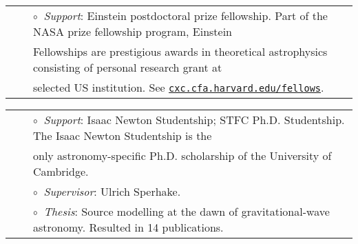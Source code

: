 \documentclass[a4paper]{moderncv}
\begin{document}
\vspace{-0.1cm}
\begin{tabular}{rcl}
&\hspace{0.4cm} &$\circ\;\;${\textit{Support}}: Einstein postdoctoral prize fellowship.  Part of the NASA prize fellowship program, Einstein\\
&\hspace{0.4cm} &  \hspace{0.4cm}Fellowships are prestigious awards in theoretical astrophysics consisting of personal research grant at\\
&\hspace{0.4cm} &  \hspace{0.4cm}selected US institution. See  \href{http://cxc.cfa.harvard.edu/fellows}{\texttt{cxc.cfa.harvard.edu/fellows}}.\\
\end{tabular}

\vspace{0.2cm}
\vspace{-0.1cm}
\begin{tabular}{rcl}
&\hspace{0.4cm} &$\circ\;\;${\textit{Support}}: Isaac Newton Studentship; STFC Ph.D. Studentship. The
Isaac Newton Studentship is the \\&\hspace{0.4cm} &  
\hspace{0.4cm}only astronomy-specific Ph.D. scholarship of the University of Cambridge.\\
&\hspace{0.4cm} &$\circ\;\;${\textit{Supervisor}}: Ulrich Sperhake.\\
&\hspace{0.4cm} &$\circ\;\;${\textit{Thesis}}: Source modelling at the dawn of gravitational-wave astronomy. Resulted in 14 publications.\\
\end{tabular}


\end{document}
